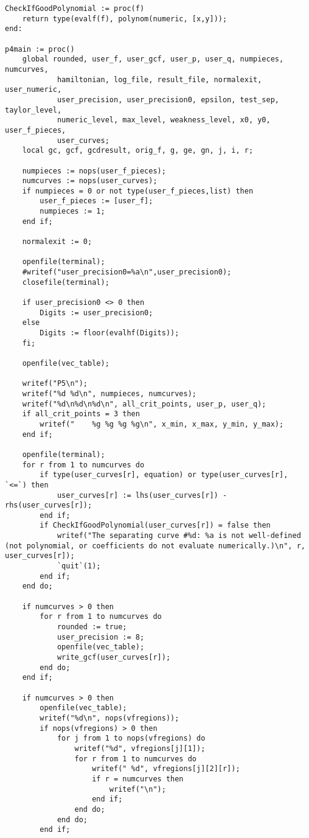 \documentclass[a4paper,10pt]{article}
\begin{document}
\begin{lstlisting}[name=main]
CheckIfGoodPolynomial := proc(f)
    return type(evalf(f), polynom(numeric, [x,y]));
end:

p4main := proc()
    global rounded, user_f, user_gcf, user_p, user_q, numpieces, numcurves,
            hamiltonian, log_file, result_file, normalexit, user_numeric,
            user_precision, user_precision0, epsilon, test_sep, taylor_level,
            numeric_level, max_level, weakness_level, x0, y0, user_f_pieces,
            user_curves;
    local gc, gcf, gcdresult, orig_f, g, ge, gn, j, i, r;

    numpieces := nops(user_f_pieces);
    numcurves := nops(user_curves);
    if numpieces = 0 or not type(user_f_pieces,list) then
        user_f_pieces := [user_f];
        numpieces := 1;
    end if;

    normalexit := 0;

    openfile(terminal);
    #writef("user_precision0=%a\n",user_precision0);
    closefile(terminal);

    if user_precision0 <> 0 then
        Digits := user_precision0;
    else
        Digits := floor(evalhf(Digits));
    fi;

    openfile(vec_table);

    writef("P5\n");
    writef("%d %d\n", numpieces, numcurves);
    writef("%d\n%d\n%d\n", all_crit_points, user_p, user_q);
    if all_crit_points = 3 then
        writef("    %g %g %g %g\n", x_min, x_max, y_min, y_max);
    end if;

    openfile(terminal);
    for r from 1 to numcurves do
        if type(user_curves[r], equation) or type(user_curves[r], `<=`) then
            user_curves[r] := lhs(user_curves[r]) - rhs(user_curves[r]);
        end if;
        if CheckIfGoodPolynomial(user_curves[r]) = false then
            writef("The separating curve #%d: %a is not well-defined (not polynomial, or coefficients do not evaluate numerically.)\n", r, user_curves[r]);
            `quit`(1);
        end if;
    end do;

    if numcurves > 0 then
        for r from 1 to numcurves do
            rounded := true;
            user_precision := 8;
            openfile(vec_table);
            write_gcf(user_curves[r]);
        end do;
    end if;

    if numcurves > 0 then
        openfile(vec_table);
        writef("%d\n", nops(vfregions));
        if nops(vfregions) > 0 then
            for j from 1 to nops(vfregions) do
                writef("%d", vfregions[j][1]);
                for r from 1 to numcurves do
                    writef(" %d", vfregions[j][2][r]);
                    if r = numcurves then
                        writef("\n");
                    end if;
                end do;
            end do;
        end if;


\end{lstlisting}
\end{document}
